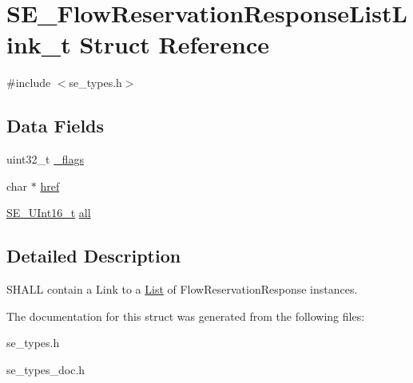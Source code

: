\hypertarget{structSE__FlowReservationResponseListLink__t}{}\section{S\+E\+\_\+\+Flow\+Reservation\+Response\+List\+Link\+\_\+t Struct Reference}
\label{structSE__FlowReservationResponseListLink__t}


{\ttfamily \#include $<$se\+\_\+types.\+h$>$}

\subsection*{Data Fields}
\begin{DoxyCompactItemize}
\item 
uint32\+\_\+t \hyperlink{group__FlowReservationResponseListLink_ga472e40613d38ed956c259f385ad4c968}{\+\_\+flags}
\item 
char $\ast$ \hyperlink{group__FlowReservationResponseListLink_ga5b80e4ee833995e4a00a6a74745ffd7d}{href}
\item 
\hyperlink{group__UInt16_gac68d541f189538bfd30cfaa712d20d29}{S\+E\+\_\+\+U\+Int16\+\_\+t} \hyperlink{group__FlowReservationResponseListLink_ga02d2763d5df8aaabc150972dee8b15f6}{all}
\end{DoxyCompactItemize}


\subsection{Detailed Description}
S\+H\+A\+LL contain a Link to a \hyperlink{structList}{List} of Flow\+Reservation\+Response instances. 

The documentation for this struct was generated from the following files\+:\begin{DoxyCompactItemize}
\item 
se\+\_\+types.\+h\item 
se\+\_\+types\+\_\+doc.\+h\end{DoxyCompactItemize}
